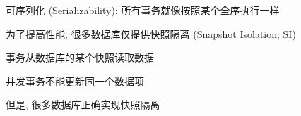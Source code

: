 
\begin{frame}{}
\end{frame}

\begin{frame}{}
  \begin{center}
    可序列化 (Serializability): 所有事务就像按照某个全序执行一样

    \vspace{0.30cm}
  \end{center}
\end{frame}

\begin{frame}{}
  \begin{center}
    为了提高性能, 很多数据库仅提供快照隔离 (Snapshot Isolation; SI)

    \vspace{0.30cm}
  \end{center}
\end{frame}

\begin{frame}{}
  \begin{center}
		\resizebox{0.50\textwidth}{!}{}

    \vspace{0.50cm}
     事务从数据库的某个快照读取数据
  \end{center}
\end{frame}

\begin{frame}{}
  \begin{center}
    \resizebox{0.48\textwidth}{!}{}

    \vspace{0.50cm}
     并发事务不能更新同一个数据项
  \end{center}
\end{frame}

\begin{frame}{}
  \begin{center}
    但是, 很多数据库正确实现快照隔离

    \vspace{0.30cm}
  \end{center}
\end{frame}

